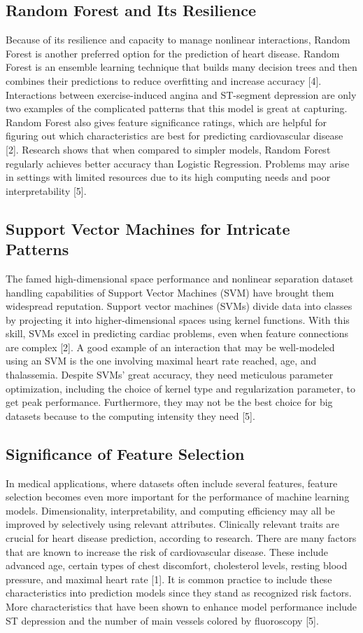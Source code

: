 \subsection{Random Forest and Its Resilience}
Because of its resilience and capacity to manage nonlinear interactions, Random Forest is another preferred option for the prediction of heart disease. Random Forest is an ensemble learning technique that builds many decision trees and then combines their predictions to reduce overfitting and increase accuracy [4]. Interactions between exercise-induced angina and ST-segment depression are only two examples of the complicated patterns that this model is great at capturing. Random Forest also gives feature significance ratings, which are helpful for figuring out which characteristics are best for predicting cardiovascular disease [2]. Research shows that when compared to simpler models, Random Forest regularly achieves better accuracy than Logistic Regression. Problems may arise in settings with limited resources due to its high computing needs and poor interpretability [5].

\subsection{Support Vector Machines for Intricate Patterns}
The famed high-dimensional space performance and nonlinear separation dataset handling capabilities of Support Vector Machines (SVM) have brought them widespread reputation. Support vector machines (SVMs) divide data into classes by projecting it into higher-dimensional spaces using kernel functions. With this skill, SVMs excel in predicting cardiac problems, even when feature connections are complex [2]. A good example of an interaction that may be well-modeled using an SVM is the one involving maximal heart rate reached, age, and thalassemia. Despite SVMs' great accuracy, they need meticulous parameter optimization, including the choice of kernel type and regularization parameter, to get peak performance. Furthermore, they may not be the best choice for big datasets because to the computing intensity they need [5].

\subsection{Significance of Feature Selection}
In medical applications, where datasets often include several features, feature selection becomes even more important for the performance of machine learning models. Dimensionality, interpretability, and computing efficiency may all be improved by selectively using relevant attributes. Clinically relevant traits are crucial for heart disease prediction, according to research. There are many factors that are known to increase the risk of cardiovascular disease. These include advanced age, certain types of chest discomfort, cholesterol levels, resting blood pressure, and maximal heart rate [1]. It is common practice to include these characteristics into prediction models since they stand as recognized risk factors. More characteristics that have been shown to enhance model performance include ST depression and the number of main vessels colored by fluoroscopy [5].
